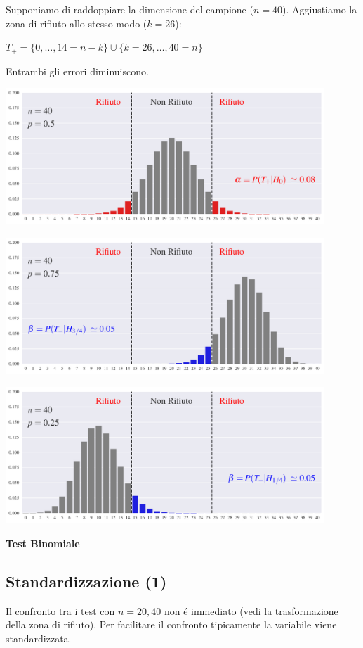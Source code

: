 \documentclass[12pt,openany]{book}
\theoremstyle{mio}
\theoremstyle{liscio}
\begin{document}
Supponiamo di raddoppiare la dimensione del campione ($n=40$). Aggiustiamo la zona di rifiuto allo stesso modo ($k=26$): 

\hfil$T_+=\{0,\dots,14=n-k\}\cup \{k=26,\dots,40=n\}$

Entrambi gli errori diminuiscono.


\hfil\includegraphics[width=0.9\textwidth]{figure/B-test_07.pdf}

\hfil\includegraphics[width=0.9\textwidth]{figure/B-test_08.pdf}

\hfil\includegraphics[width=0.9\textwidth]{figure/B-test_09.pdf}




\hfill{}\clearpage\hfill\textbf{Test Binomiale}
\subsection{Standardizzazione (1)}

Il confronto tra i test con $n=20, 40$ non é immediato (vedi la trasformazione della zona di rifiuto). Per facilitare il confronto tipicamente la variabile viene standardizzata. 
\end{document}
